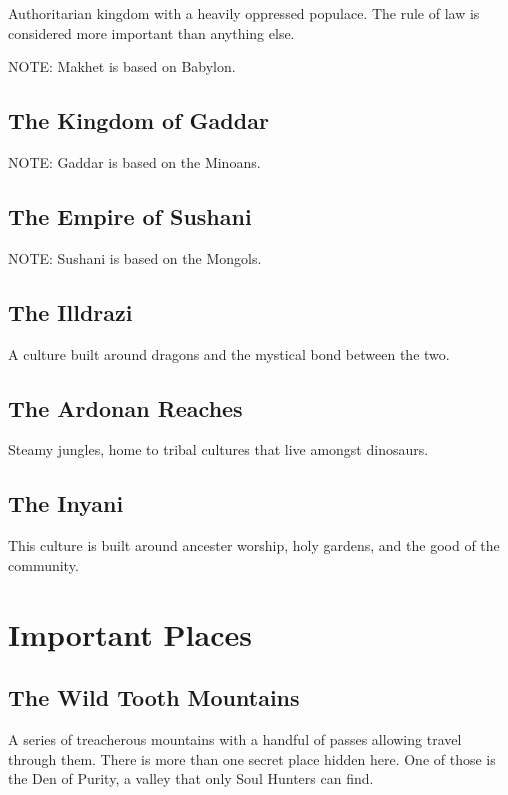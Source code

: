 \begin{multicols}{2}
Authoritarian kingdom with a heavily oppressed populace. The rule
of law is considered more important than anything else.

NOTE: Makhet is based on Babylon.

\subsection{The Kingdom of Gaddar}

NOTE: Gaddar is based on the Minoans.

\subsection{The Empire of Sushani}

NOTE: Sushani is based on the Mongols.

\subsection{The Illdrazi}

A culture built around dragons and the mystical bond between the two.

\subsection{The Ardonan Reaches}

Steamy jungles, home to tribal cultures that live amongst dinosaurs.

\subsection{The Inyani}

This culture is built around ancester worship, holy gardens, and the
good of the community.

\section{Important Places}

\subsection{The Wild Tooth Mountains}

A series of treacherous mountains with a handful of passes allowing
travel through them. There is more than one secret place hidden here.
One of those is the Den of Purity, a valley that only Soul Hunters
can find.


\end{multicols}

